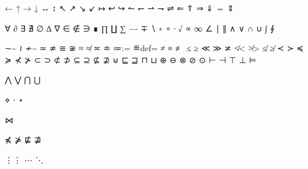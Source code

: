 ←\leftarrow  %
↑\uparrow    %
→\rightarrow %
↓\downarrow  %
↔\leftrightarrow %
↕\updownarrow    %
↖\nwarrow %
↗\nearrow %
↘\searrow %
↙\swarrow %
↦\mapsto %
↩\hookleftarrow  %
↪\hookrightarrow %
↼\leftharpoonup     %
↽\leftharpoondown   %
⇀\rightharpoonup    %
⇁\rightharpoondown  %
⇌\rightleftharpoons %
⇐\Leftarrow      %
⇑\Uparrow        %
⇒\Rightarrow     %
⇓\Downarrow      %
⇔\Leftrightarrow %
⇕\Updownarrow    %

∀\forall   %
∂\partial  %
∃\exists   %
∄{\mathord{\!\not\,}\exists} %
∅\emptyset %
∆\triangle %
∇\nabla    %
∈\in    %
∉\notin %
∋\ni    %
∎\diamond %
∏\prod   %
∐\coprod %
∑\sum    %
−-    %
∓\mp  %
∖\setminus %
∗\ast      %
∘\circ     %
∙\bullet   %
√\surd     %
∝\propto %
∞\infty %
∠\angle %
∣\mid      %
∥\parallel %
∧\wedge %
∨\vee   %
∩\cap   %
∪\cup   %
∫\int  %
∮\oint %

∼\sim %
≀\wr %
≁{\not\sim}   %
≃\simeq %
≄{\not\simeq} %
≅\cong %
≆{\not\cong} %
≈\approx %
≉{\not\approx} %
≍\asymp %
≐\doteq %
≔{:=} %
≝{\buildrel\rm def\over=} %
≠\neq %
≡\equiv %
≢{\not\equiv} %
≤\leq %
≥\geq %
≪\ll %
≫\gg %
≭{\not\asymp} %
≮{\not<}    %
≯{\not>}    %
≰{\not\leq} %
≱{\not\geq} %
≺\prec %
≻\succ %
≼\preceq %
≽\succeq %
⊀{\not\prec} %
⊁{\not\succ} %
⊂\subset %
⊃\supset %
⊄{\not\subset} %
⊅{\not\supset} %
⊆\subseteq %
⊇\supseteq %
⊈{\not\subseteq} %
⊉{\not\supseteq} %
⊎\uplus %
⊑\sqsubseteq %
⊒\sqsupseteq %
⊓\sqcap %
⊔\sqcup %
⊕\oplus  %
⊖\ominus %
⊗\otimes %
⊘\oslash %
⊙\odot   %
⊢\vdash %
⊣\dashv %
⊤\top %
⊥\bot %
⊨\models %

⋀\bigwedge %
⋁\bigvee   %
⋂\bigcap   %
⋃\bigcup   %

⋄\diamond %
⋅\cdot    %
⋆\star    %

⋈\bowtie %

⋠{\not\preceq} %
⋡{\not\succeq} %
⋢{\not\sqsubseteq} %
⋣{\not\sqsupseteq} %

⋮\vdots %
⋯\cdots %
⋱\ddots %

